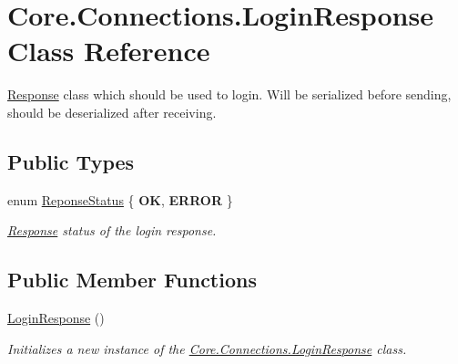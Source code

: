\hypertarget{classCore_1_1Connections_1_1LoginResponse}{}\section{Core.\+Connections.\+Login\+Response Class Reference}
\label{classCore_1_1Connections_1_1LoginResponse}


\hyperlink{classCore_1_1Connections_1_1Response}{Response} class which should be used to login. Will be serialized before sending, should be deserialized after receiving.  


\subsection*{Public Types}
\begin{DoxyCompactItemize}
\item 
enum \hyperlink{classCore_1_1Connections_1_1LoginResponse_ad726169217eaad8b926b7548d43020d8}{Reponse\+Status} \{ {\bfseries O\+K}, 
{\bfseries E\+R\+R\+O\+R}
 \}\begin{DoxyCompactList}\small\item\em \hyperlink{classCore_1_1Connections_1_1Response}{Response} status of the login response. \end{DoxyCompactList}
\end{DoxyCompactItemize}
\subsection*{Public Member Functions}
\begin{DoxyCompactItemize}
\item 
\hyperlink{classCore_1_1Connections_1_1LoginResponse_ab9a1fa386052ddf7917d3367bb8f1fb1}{Login\+Response} ()
\begin{DoxyCompactList}\small\item\em Initializes a new instance of the \hyperlink{classCore_1_1Connections_1_1LoginResponse}{Core.\+Connections.\+Login\+Response} class. \end{DoxyCompactList}\end{DoxyCompactItemize}

